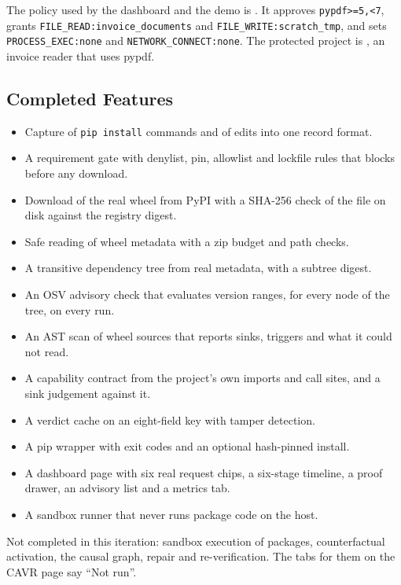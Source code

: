 \begin{sloppypar}
The policy used by the dashboard and the demo is . It approves \texttt{pypdf>=5,<7}, grants \texttt{FILE\_READ:invoice\_documents} and \texttt{FILE\_WRITE:scratch\_tmp}, and sets \texttt{PROCESS\_EXEC:none} and \texttt{NETWORK\_CONNECT:none}. The protected project is , an invoice reader that uses pypdf.
\end{sloppypar}

\subsection{Completed Features}
\begin{itemize}
    \item Capture of \texttt{pip install} commands and of  edits into one record format.
    \item A requirement gate with denylist, pin, allowlist and lockfile rules that blocks before any download.
    \item Download of the real wheel from PyPI with a SHA-256 check of the file on disk against the registry digest.
    \item Safe reading of wheel metadata with a zip budget and path checks.
    \item A transitive dependency tree from real metadata, with a subtree digest.
    \item An OSV advisory check that evaluates version ranges, for every node of the tree, on every run.
    \item An AST scan of wheel sources that reports sinks, triggers and what it could not read.
    \item A capability contract from the project's own imports and call sites, and a sink judgement against it.
    \item A verdict cache on an eight-field key with tamper detection.
    \item A pip wrapper with exit codes and an optional hash-pinned install.
    \item A dashboard page with six real request chips, a six-stage timeline, a proof drawer, an advisory list and a metrics tab.
    \item A sandbox runner that never runs package code on the host.
\end{itemize}
Not completed in this iteration: sandbox execution of packages, counterfactual activation, the causal graph, repair and re-verification. The tabs for them on the CAVR page say ``Not run''.


